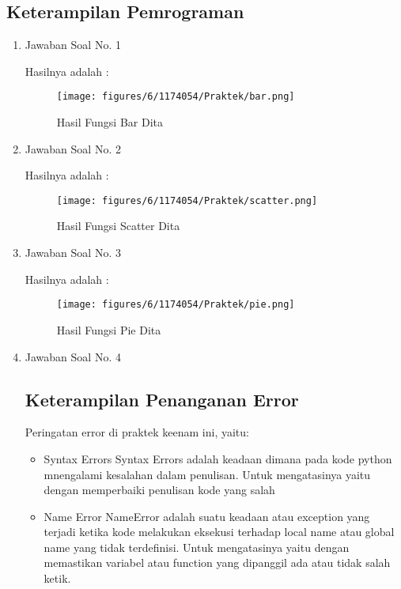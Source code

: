 \subsection{Keterampilan Pemrograman}
\begin{enumerate}

\item Jawaban Soal No. 1

Hasilnya adalah : 
\begin{figure}[H]
	\texttt{[image: figures/6/1174054/Praktek/bar.png]}
	\centering
	\caption{Hasil Fungsi Bar Dita}
\end{figure}

\item Jawaban Soal No. 2

Hasilnya adalah : 
\begin{figure}[H]
	\texttt{[image: figures/6/1174054/Praktek/scatter.png]}
	\centering
	\caption{Hasil Fungsi Scatter Dita}
\end{figure}

\item Jawaban Soal No. 3

Hasilnya adalah : 
\begin{figure}[H]
	\texttt{[image: figures/6/1174054/Praktek/pie.png]}
	\centering
	\caption{Hasil Fungsi Pie Dita}
\end{figure}

\item Jawaban Soal No. 4


\subsection{Keterampilan Penanganan Error}

Peringatan error di praktek keenam ini, yaitu:
\begin{itemize}
\item Syntax Errors
Syntax Errors adalah keadaan dimana pada kode python mnengalami kesalahan dalam penulisan. Untuk mengatasinya yaitu dengan memperbaiki penulisan kode yang salah 

\item Name Error
NameError adalah suatu keadaan atau exception yang terjadi ketika kode melakukan eksekusi terhadap local name atau global name yang tidak terdefinisi. Untuk mengatasinya yaitu dengan memastikan variabel atau function yang dipanggil ada atau tidak salah ketik.


\end{itemize}
\end{enumerate}
